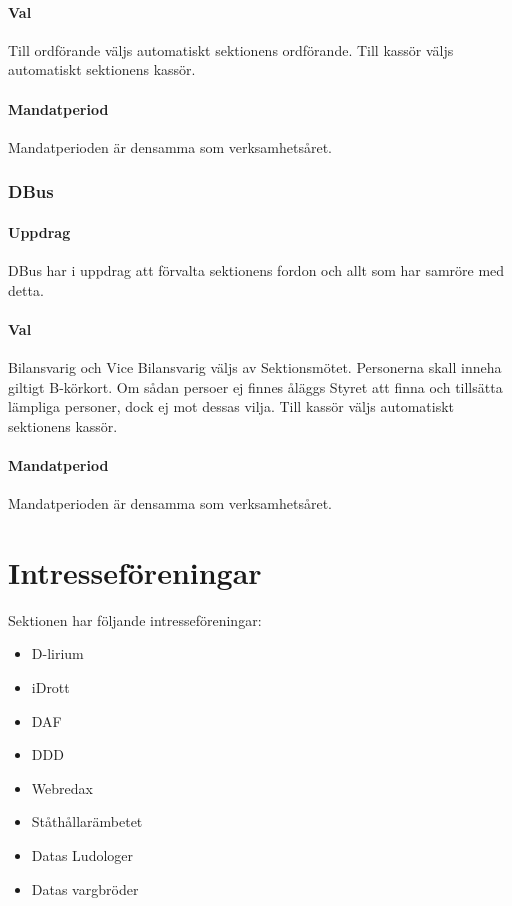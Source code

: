 \documentclass[a4paper, 10pt]{article}
\begin{document}
\paragraph{Val\\}
Till ordförande väljs automatiskt sektionens ordförande. Till kassör väljs automatiskt sektionens kassör.
\paragraph{Mandatperiod\\}
Mandatperioden är densamma som verksamhetsåret.
\subsubsection{DBus}
\paragraph{Uppdrag\\}
DBus har i uppdrag att förvalta sektionens fordon och allt som har samröre med detta.
\paragraph{Val\\}
Bilansvarig och Vice Bilansvarig väljs av Sektionsmötet. Personerna skall inneha giltigt B-körkort. Om sådan persoer ej finnes åläggs Styret att finna och tillsätta lämpliga personer, dock ej mot dessas vilja. Till kassör väljs automatiskt sektionens kassör.
\paragraph{Mandatperiod\\}
Mandatperioden är densamma som verksamhetsåret.
\newpage
\section{Intresseföreningar}
Sektionen har följande intresseföreningar:
\begin{itemize}
  \item D-lirium 
  \item iDrott 
  \item DAF 
  \item DDD
  \item Webredax
  \item Ståthållarämbetet
  \item Datas Ludologer 
  \item Datas vargbröder
\end{itemize}
\end{document}

